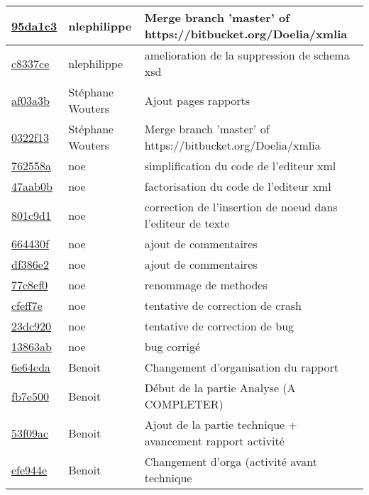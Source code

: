 \begin{tabular}{l l l}
\href{95da1c31e1ccee07312a6f271bb4e31e956c4e05}{95da1c3} & nlephilippe & Merge branch 'master' of https://bitbucket.org/Doelia/xmlia\\\hline
\href{c8337ce8fa776249e2de6ec7df5bcb1b16095370}{c8337ce} & nlephilippe & amelioration de la suppression de schema xsd\\\hline
\href{af03a3b55cda3513b0ba281170ca61cd4c94a4b2}{af03a3b} & Stéphane Wouters & Ajout pages rapports\\\hline
\href{0322f1348caa561cf76886d49eb4fed027e82438}{0322f13} & Stéphane Wouters & Merge branch 'master' of https://bitbucket.org/Doelia/xmlia\\\hline
\href{762558ab23940ef64437c82637016de558de0ec2}{762558a} & noe & simplification du code de l'editeur xml\\\hline
\href{47aab0b69a4f3badb756ced97d7376aece4451f8}{47aab0b} & noe & factorisation du code de l'editeur xml\\\hline
\href{801c9d1ed9f1bf554004623ba941c323bafaaaa3}{801c9d1} & noe & correction de l'insertion de noeud dans l'editeur de texte\\\hline
\href{664430f3ad015ca1a59c4a7c9c1fc231ee7bd7de}{664430f} & noe & ajout de commentaires\\\hline
\href{df386e2bb03e780213344e0cf6c09d91739c6798}{df386e2} & noe & ajout de commentaires\\\hline
\href{77c8ef0ecf48ce01aa099056e3ae303d301432d4}{77c8ef0} & noe & renommage de methodes\\\hline
\href{cfeff7e4e2765c05c9be36c3003f886d311f1846}{cfeff7e} & noe & tentative de correction de crash\\\hline
\href{23dc9203d4e91899a8bf5082a0516e792f2ad5b4}{23dc920} & noe & tentative de correction de bug\\\hline
\href{13863ab8663a69d7804f35d5de63d2c796eb53ba}{13863ab} & noe & bug corrigé\\\hline
\href{6e64eda5af8ab61fa04b21ee74a028dcaead8c9e}{6e64eda} & Benoit & Changement d'organisation du rapport\\\hline
\href{fb7e5000db02cca7208c6d81f87264e19c6a0517}{fb7e500} & Benoit & Début de la partie Analyse (A COMPLETER)\\\hline
\href{53f09aca842628915deae488483e9871d2f31340}{53f09ac} & Benoit & Ajout de la partie technique + avancement rapport activité\\\hline
\href{efe944ef5959a9e5bc93af6864e52cc5124b9bad}{efe944e} & Benoit & Changement d'orga (activité avant technique\\\hline

\end{tabular}
